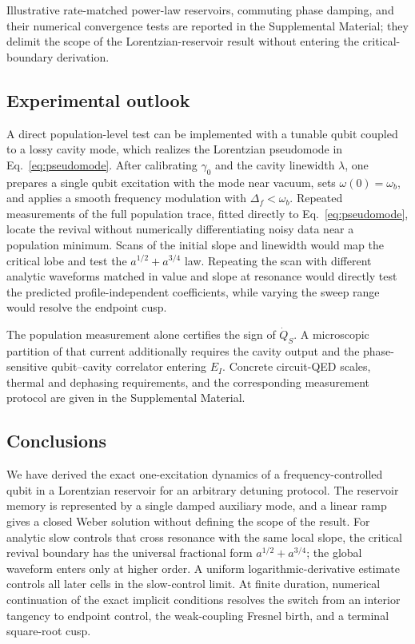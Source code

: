 \documentclass[reprint,superscriptaddress,floatfix,amsmath,amssymb,prresearch,aps]{revtex4-2}
\begin{document}
Illustrative rate-matched power-law reservoirs, commuting phase damping, and their numerical convergence tests are reported in the Supplemental Material; they delimit the scope of the Lorentzian-reservoir result without entering the critical-boundary derivation.

\subsection{Experimental outlook}

A direct population-level test can be implemented with a tunable qubit coupled
to a lossy cavity mode, which realizes the Lorentzian pseudomode in
Eq.~\eqref{eq:pseudomode}. After calibrating \(\gamma_0\) and the cavity
linewidth \(\lambda\), one prepares a single qubit excitation with the mode
near vacuum, sets \(\omega(0)=\omega_b\), and applies a smooth frequency
modulation with
\(\Delta_f<\omega_b\). Repeated measurements of the full population trace,
fitted directly to Eq.~\eqref{eq:pseudomode}, locate the revival without
numerically differentiating noisy data near a population minimum. Scans of
the initial slope and linewidth would map the critical lobe and test the
\(a^{1/2}+a^{3/4}\) law. Repeating the scan with different analytic waveforms
matched in value and slope at resonance would directly test the predicted profile-independent
coefficients, while varying the sweep range would resolve the endpoint cusp.

The population measurement alone certifies the sign of \(\dot Q_S\). A
microscopic partition of that current additionally requires the cavity output
and the phase-sensitive qubit--cavity correlator entering \(E_I\). Concrete
circuit-QED scales, thermal and dephasing requirements, and the corresponding
measurement protocol are given in the Supplemental Material.

\subsection{Conclusions}
\label{sec:conclusion}

We have derived the exact one-excitation dynamics of a frequency-controlled
qubit in a Lorentzian reservoir for an arbitrary detuning protocol. The
reservoir memory is represented by a single damped auxiliary mode, and a
linear ramp gives a closed Weber solution without defining the scope of the
result. For analytic slow controls that cross resonance with the same local
slope, the critical revival boundary has the universal fractional form
\(a^{1/2}+a^{3/4}\); the global waveform enters only at higher order. A
uniform logarithmic-derivative estimate controls all later cells in the
slow-control limit. At finite duration, numerical continuation of the exact
implicit conditions resolves the switch from an interior tangency to endpoint
control, the weak-coupling Fresnel birth, and a terminal square-root cusp.
\end{document}
